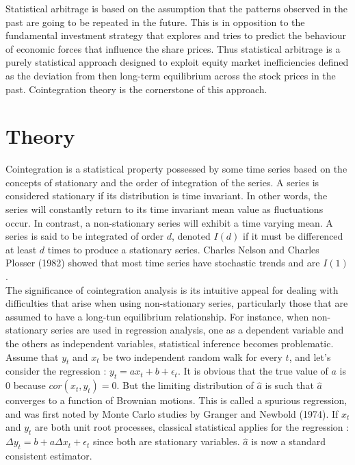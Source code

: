 \documentclass[11pt,a4,twosided,singlespacing,titlepagenumber=on]{scrreprt}
\numberwithin{equation}{chapter} %
\theoremstyle{remark}
\begin{document}
Statistical arbitrage is based on the assumption that the patterns observed in the past are going to be repeated in the future. This is in opposition to the fundamental investment strategy that explores and tries to predict the behaviour of economic forces that influence the share prices. Thus statistical arbitrage is a purely statistical approach designed to exploit equity market inefficiencies defined as the deviation from then long-term equilibrium across the stock prices in the past. Cointegration theory is the cornerstone of this approach. 

\section{Theory}
Cointegration is a statistical property possessed by some time series based on the concepts of stationary and the order of integration of the series. A series is considered stationary if its distribution is time invariant. In other words, the series will constantly return to its time invariant mean value as fluctuations occur. In contrast, a non-stationary series will exhibit a time varying mean. A series is said to be integrated of order $d$, denoted $I(d)$ if it must be differenced at least $d$ times to produce a stationary series.
Charles Nelson and Charles Plosser (1982) showed that most time series have stochastic trends and are $I(1)$. \\

\noindent
The significance of cointegration analysis is its intuitive appeal for dealing with difficulties that arise when using non-stationary series, particularly those that are assumed to have a long-tun equilibrium relationship. For instance, when non-stationary series are used in regression analysis, one as a dependent variable and the others as independent variables, statistical inference becomes problematic. Assume that $y_t$ and $x_t$ be two independent random walk for every $t$, and let's consider the regression : $y_t = a x_t + b + \epsilon_t$. It is obvious that the true value of $a$ is 0 because $cor(x_t, y_t) = 0$. But the limiting distribution of $\hat{a}$ is such that $\hat{a}$ converges to a function of Brownian motions. This is called a spurious regression, and was first noted by Monte Carlo studies by Granger and Newbold (1974). If $x_t$ and $y_t$ are both unit root processes, classical statistical applies for the regression : $\Delta y_t = b + a \Delta x_t + \epsilon_t$ since both are stationary variables. $\hat{a}$ is now a standard consistent estimator. \\
\end{document}
